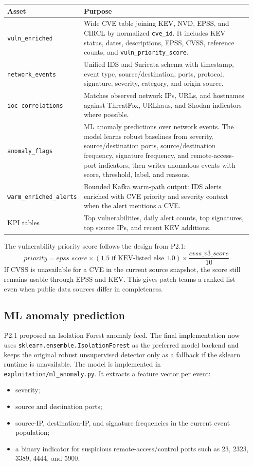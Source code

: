 \documentclass[11pt,a4paper]{article}
\newcommand{\code}[1]{\nolinkurl{#1}}
\newcommand{\hdr}{\rowcolor{csiHead}}
\begin{document}
\begin{tabularx}{\textwidth}{>{\raggedright\arraybackslash}p{3.55cm}X}
\toprule
\hdr
\textbf{Asset} & \textbf{Purpose}\\
\midrule
\code{vuln_enriched} & Wide CVE table joining KEV, NVD, EPSS, and CIRCL by normalized \code{cve_id}. It includes KEV status, dates, descriptions, EPSS, CVSS, reference counts, and \code{vuln_priority_score}.\\
\code{network_events} & Unified IDS and Suricata schema with timestamp, event type, source/destination, ports, protocol, signature, severity, category, and origin source.\\
\code{ioc_correlations} & Matches observed network IPs, URLs, and hostnames against ThreatFox, URLhaus, and Shodan indicators where possible.\\
\code{anomaly_flags} & ML anomaly predictions over network events. The model learns robust baselines from severity, source/destination ports, source/destination frequency, signature frequency, and remote-access-port indicators, then writes anomalous events with score, threshold, label, and reasons.\\
\code{warm_enriched_alerts} & Bounded Kafka warm-path output: IDS alerts enriched with CVE priority and severity context when the alert mentions a CVE.\\
KPI tables & Top vulnerabilities, daily alert counts, top signatures, top source IPs, and recent KEV additions.\\
\bottomrule
\end{tabularx}

The vulnerability priority score follows the design from P2.1:
\[
\textit{priority} = \textit{epss\_score} \times (1.5 \text{ if KEV-listed else } 1.0) \times \frac{\textit{cvss\_v3\_score}}{10}
\]
If CVSS is unavailable for a CVE in the current source snapshot, the score still remains usable through EPSS and KEV. This gives patch teams a ranked list even when public data sources differ in completeness.

\subsection{ML anomaly prediction}

P2.1 proposed an Isolation Forest anomaly feed. The final implementation now uses \code{sklearn.ensemble.IsolationForest} as the preferred model backend and keeps the original robust unsupervised detector only as a fallback if the sklearn runtime is unavailable. The model is implemented in \code{exploitation/ml_anomaly.py}. It extracts a feature vector per event:
\begin{itemize}
  \item severity;
  \item source and destination ports;
  \item source-IP, destination-IP, and signature frequencies in the current event population;
  \item a binary indicator for suspicious remote-access/control ports such as 23, 2323, 3389, 4444, and 5900.
\end{itemize}
\end{document}
